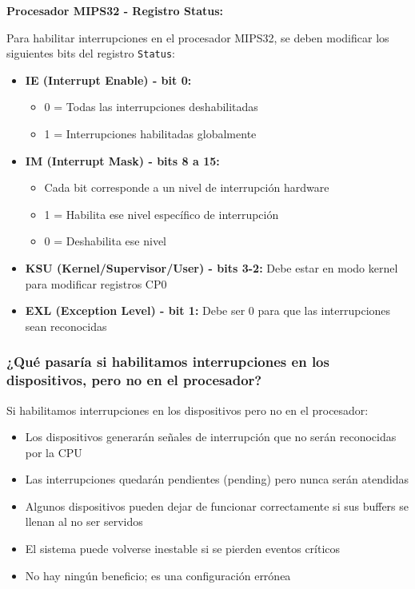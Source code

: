 \documentclass[12pt]{article}
\begin{document}
\textbf{Procesador MIPS32 - Registro Status:}

Para habilitar interrupciones en el procesador MIPS32, se deben modificar los siguientes bits del registro \texttt{Status}:

\begin{itemize}
	\item \textbf{IE (Interrupt Enable) - bit 0:}
	\begin{itemize}
		\item 0 = Todas las interrupciones deshabilitadas
		\item 1 = Interrupciones habilitadas globalmente
	\end{itemize}
	
	\item \textbf{IM (Interrupt Mask) - bits 8 a 15:}
	\begin{itemize}
		\item Cada bit corresponde a un nivel de interrupción hardware
		\item 1 = Habilita ese nivel específico de interrupción
		\item 0 = Deshabilita ese nivel
	\end{itemize}
	
	\item \textbf{KSU (Kernel/Supervisor/User) - bits 3-2:} Debe estar en modo kernel para modificar registros CP0
	
	\item \textbf{EXL (Exception Level) - bit 1:} Debe ser 0 para que las interrupciones sean reconocidas
\end{itemize}

\subsubsection{¿Qué pasaría si habilitamos interrupciones en los dispositivos, pero no en el procesador?}

Si habilitamos interrupciones en los dispositivos pero no en el procesador:
\begin{itemize}
	\item Los dispositivos generarán señales de interrupción que no serán reconocidas por la CPU
	\item Las interrupciones quedarán pendientes (pending) pero nunca serán atendidas
	\item Algunos dispositivos pueden dejar de funcionar correctamente si sus buffers se llenan al no ser servidos
	\item El sistema puede volverse inestable si se pierden eventos críticos
	\item No hay ningún beneficio; es una configuración errónea
\end{itemize}
\end{document}
